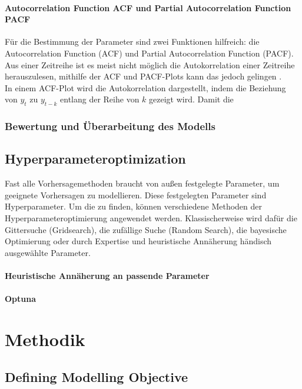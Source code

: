 \documentclass[12pt]{report}
\begin{document}
	\subsubsection{Autocorrelation Function ACF und Partial Autocorrelation Function PACF}
	Für die Bestimmung der Parameter sind zwei Funktionen hilfreich: die Autocorrelation Function (ACF) und Partial Autocorrelation Function (PACF). Aus einer Zeitreihe ist es meist nicht möglich die Autokorrelation einer Zeitreihe herauszulesen, mithilfe der ACF und PACF-Plots kann das jedoch gelingen \cite[Kapitel 8.5]{Hyndman.May2018}. \\
	In einem ACF-Plot wird die Autokorrelation dargestellt, indem die Beziehung von $y_t$ zu $y_{t-k}$ entlang der Reihe von $k$ gezeigt wird. Damit die 
	
	\subsection{Bewertung und Überarbeitung des Modells}%
	
	\section{Hyperparameteroptimization}
	Fast alle Vorhersagemethoden braucht von außen festgelegte Parameter, um geeignete Vorhersagen zu modellieren. Diese festgelegten Parameter sind Hyperparameter. Um die zu finden, können verschiedene Methoden der Hyperparameteroptimierung angewendet werden. Klassischerweise wird dafür die Gittersuche (Gridsearch), die zufällige Suche (Random Search), die bayesische Optimierung oder durch Expertise und heuristische Annäherung händisch ausgewählte Parameter. 
	\subsubsection{Heuristische Annäherung an passende Parameter}
	\subsubsection{Optuna}
	
	\chapter{Methodik} %
	\section{Defining Modelling Objective}
\end{document}
